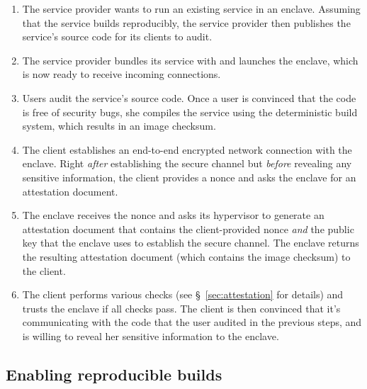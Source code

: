 \begin{enumerate}
    \item The service provider wants to run an existing service in an enclave.
      Assuming that the service builds reproducibly, the service provider then
      publishes the service's source code for its clients to audit.

    \item The service provider bundles its service with \tool{} and launches the
      enclave, which is now ready to receive incoming connections.

    \item Users audit the service's source code.  Once a user is convinced that
      the code is free of security bugs, she compiles the service using the
      deterministic build system, which results in an image checksum.

    \item The client establishes an end-to-end encrypted network connection with
      the enclave.  Right \emph{after} establishing the secure channel but
      \emph{before} revealing any sensitive information, the client provides a
      nonce and asks the enclave for an attestation document.

    \item The enclave receives the nonce and asks its hypervisor to generate an
      attestation document that contains the client-provided nonce
      \emph{and} the public key that the enclave uses to establish the secure
      channel.  The enclave returns the resulting attestation document (which
      contains the image checksum) to the client.

    \item The client performs various checks (see \S~\ref{sec:attestation} for
      details) and trusts the enclave if all checks pass.  The client is then
      convinced that it's communicating with the code that the user audited in
      the previous steps, and is willing to reveal her sensitive information to
      the enclave.
\end{enumerate}

\subsection{Enabling reproducible builds}
\label{sec:build-system}

